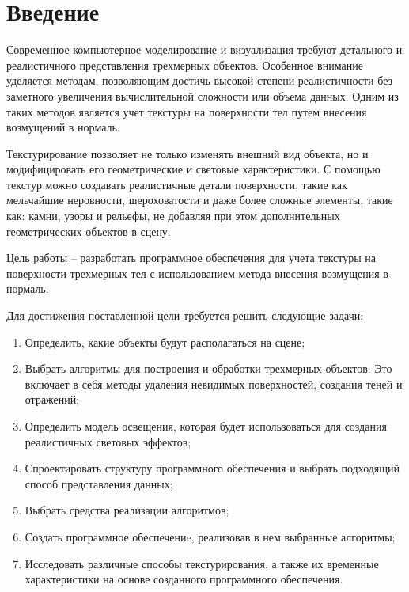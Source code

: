 \chapter*{Введение}

Современное компьютерное моделирование и визуализация требуют детального и реалистичного представления трехмерных объектов. Особенное внимание уделяется методам, позволяющим достичь высокой степени реалистичности без заметного увеличения вычислительной сложности или объема данных. Одним из таких методов является учет текстуры на поверхности тел путем внесения возмущений в нормаль.

Текстурирование позволяет не только изменять внешний вид объекта, но и модифицировать его геометрические и световые характеристики. С помощью текстур можно создавать реалистичные детали поверхности, такие как мельчайшие неровности, шероховатости и даже более сложные элементы, такие как: камни, узоры и рельефы, не добавляя при этом дополнительных геометрических объектов в сцену.

Цель работы -- разработать программное обеспечения для учета текстуры на поверхности трехмерных тел с использованием метода внесения возмущения в нормаль.

Для достижения поставленной цели требуется решить следующие задачи:
\begin{enumerate}[label=\arabic*)]
    \item Определить, какие объекты будут располагаться на сцене;
    \item Выбрать алгоритмы для построения и обработки трехмерных объектов. Это включает в себя методы удаления невидимых поверхностей, создания теней и отражений;
    \item Определить модель освещения, которая будет использоваться для создания реалистичных световых эффектов;
    \item Спроектировать структуру программного обеспечения и выбрать подходящий способ представления данных;
    \item Выбрать средства реализации алгоритмов;
    \item Создать программное обеспечениe, реализовав в нем выбранные алгоритмы;
    \item Исследовать различные способы текстурирования, а также их временные характеристики на основе созданного программного обеспечения.
\end{enumerate}
